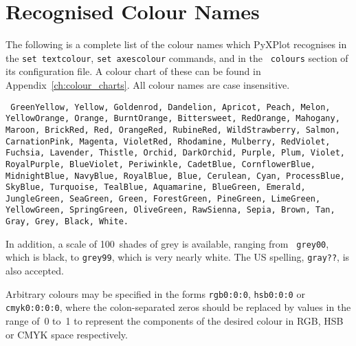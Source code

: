 \section{Recognised Colour Names}
\label{sec:colour_names}

The following is a complete list of the colour names which PyXPlot recognises
in the {\tt set textcolour}, {\tt set axescolour} commands, and in the {\tt
colours} section of its configuration file.  A colour chart of these can be
found in Appendix~\ref{ch:colour_charts}.  All colour names are case
insensitive.

\vspace{5mm}\noindent
{}
{\tt
GreenYellow, Yellow, Goldenrod, Dandelion, Apricot, Peach, Melon,\newline\noindent
YellowOrange, Orange, BurntOrange, Bittersweet, RedOrange,\newline\noindent
Mahogany, Maroon, BrickRed, Red, OrangeRed, RubineRed,\newline\noindent
WildStrawberry, Salmon, CarnationPink, Magenta, VioletRed,\newline\noindent
Rhodamine, Mulberry, RedViolet, Fuchsia, Lavender, Thistle,\newline\noindent
Orchid, DarkOrchid, Purple, Plum, Violet, RoyalPurple,\newline\noindent
BlueViolet, Periwinkle, CadetBlue, CornflowerBlue, MidnightBlue,\newline\noindent
NavyBlue, RoyalBlue, Blue, Cerulean, Cyan, ProcessBlue, SkyBlue,\newline\noindent
Turquoise, TealBlue, Aquamarine, BlueGreen, Emerald, JungleGreen,\newline\noindent
SeaGreen, Green, ForestGreen, PineGreen, LimeGreen, YellowGreen,\newline\noindent
SpringGreen, OliveGreen, RawSienna, Sepia, Brown, Tan, Gray,\newline\noindent
Grey, Black, White.
}

\vspace{5mm}
In addition, a scale of 100~shades of grey is available, ranging from {\tt
grey00}, which is black, to {\tt grey99}, which is very nearly white.  The US
spelling, {\tt gray??}, is also accepted.

Arbitrary colours may be specified in the forms {\tt rgb0:0:0}, {\tt hsb0:0:0}
or {\tt cmyk0:0:0:0}, where the colon-separated zeros should be replaced by
values in the range of~0 to~1 to represent the components of the desired colour
in RGB, HSB or CMYK space
respectively.

